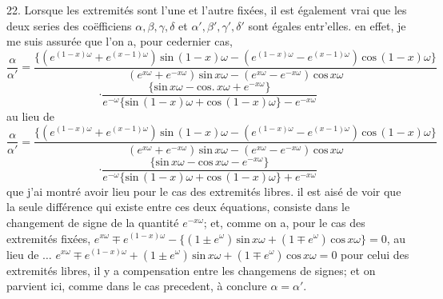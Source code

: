 \documentclass[11pt,a4paper]{article}
\begin{document}
22. Lorsque les extremités sont l'une et l'autre fixées, il est également
vrai que les deux series des coëfficiens $\alpha, \beta, \gamma, \delta$ et $\alpha', \beta', \gamma', \delta'$ sont égales entr'elles.
en effet, je me suis assurée que l'on a, pour cedernier cas,
\[ \frac{\alpha}{\alpha'} = \frac{\{(e^{(1-x)\omega} + e^{(x-1)\omega})\,\text{sin}\,(1-x)\omega - (e^{(1-x)\omega} - e^{(x-1)\omega})\,\text{cos}\,(1-x)\omega\}}{(e^{x\omega} + e^{-x\omega})\,\text{sin}\,x\omega - (e^{x\omega} - e^{-x\omega})\,\text{cos}\,x\omega} \]
\[ \cdot \frac{\{\text{sin}\,x\omega - \text{cos}.\,x\omega + e^{-x\omega}\}}{e^{-\omega}\{\text{sin}\,(1-x)\omega + \text{cos}\,(1-x)\omega\} - e^{-x\omega}} \]
au lieu de
\[ \frac{\alpha}{\alpha'} = \frac{\{(e^{(1-x)\omega} + e^{(x-1)\omega})\,\text{sin}\,(1-x)\omega - (e^{(1-x)\omega} - e^{(x-1)\omega})\,\text{cos}\,(1-x)\omega\}}{(e^{x\omega} + e^{-x\omega})\,\text{sin}\,x\omega - (e^{x\omega} - e^{-x\omega})\,\text{cos}\,x\omega} \]
\[ \cdot \frac{\{\text{sin}\,x\omega - \text{cos}\,x\omega - e^{-x\omega}\}}{e^{-\omega}\{\text{sin}\,(1-x)\omega + \text{cos}\,(1-x)\omega\} + e^{-x\omega}} \]
que j'ai montré avoir lieu pour le cas des extremités libres. il est aisé de
voir que la seule différence qui existe entre ces deux équations, consiste
dans le changement de signe de la quantité $e^{-x\omega}$; et, comme on a,
pour le cas des extremités fixées, $e^{x\omega} \mp e^{(1-x)\omega} - \{(1 \pm e^{\omega})\,\text{sin}\,x\omega + (1 \mp e^{\omega})\,\text{cos}\,x\omega\} = 0$,
au lieu de $\dots$ $e^{x\omega} \mp e^{(1-x)\omega} + (1 \pm e^{\omega})\,\text{sin}\,x\omega + (1 \mp e^{\omega})\,\text{cos}\,x\omega = 0$
pour celui des extremités libres, il y a compensation entre les changemens
de signes; et on parvient ici, comme dans le cas precedent, à conclure
$\alpha = \alpha'$.
\end{document}
